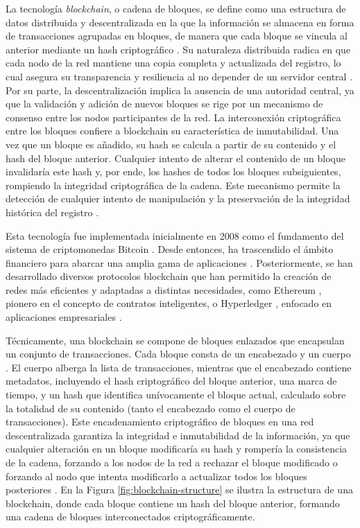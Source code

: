 La tecnología \textit{blockchain}, o cadena de bloques, se define como una estructura de datos distribuida y descentralizada en la que la información se almacena en forma de transacciones agrupadas en bloques, de manera que cada bloque se vincula al anterior mediante un hash criptográfico \cite{tripathi2023comprehensive}. Su naturaleza distribuida radica en que cada nodo de la red mantiene una copia completa y actualizada del registro, lo cual asegura su transparencia y resiliencia al no depender de un servidor central \cite{bulkowska2023implementation}. Por su parte, la descentralización implica la ausencia de una autoridad central, ya que la validación y adición de nuevos bloques se rige por un mecanismo de consenso entre los nodos participantes de la red. La interconexión criptográfica entre los bloques confiere a blockchain su característica de inmutabilidad. Una vez que un bloque es añadido, su hash se calcula a partir de su contenido y el hash del bloque anterior. Cualquier intento de alterar el contenido de un bloque invalidaría este hash y, por ende, los hashes de todos los bloques subsiguientes, rompiendo la integridad criptográfica de la cadena. Este mecanismo permite la detección de cualquier intento de manipulación y la preservación de la integridad histórica del registro \cite{bulkowska2023implementation}.

Esta tecnología fue implementada inicialmente en 2008 como el fundamento del sistema de criptomonedas Bitcoin \cite{satoshi2008bitcoin}. Desde entonces, ha trascendido el ámbito financiero para abarcar una amplia gama de aplicaciones \cite{bartolomeo2020introduccion}. Posteriormente, se han desarrollado diversos protocolos blockchain que han permitido la creación de redes más eficientes y adaptadas a distintas necesidades, como Ethereum \cite{buterin2013ethereum}, pionero en el concepto de contratos inteligentes, o Hyperledger \cite{androulaki2018hyperledger}, enfocado en aplicaciones empresariales \cite{sunny2022systematic, rennock2018blockchain}.

Técnicamente, una blockchain se compone de bloques enlazados que encapsulan un conjunto de transacciones. Cada bloque consta de un encabezado y un cuerpo \cite{tripathi2023comprehensive}. El cuerpo alberga la lista de transacciones, mientras que el encabezado contiene metadatos, incluyendo el hash criptográfico del bloque anterior, una marca de tiempo, y un hash que identifica unívocamente el bloque actual, calculado sobre la totalidad de su contenido (tanto el encabezado como el cuerpo de transacciones). Este encadenamiento criptográfico de bloques en una red descentralizada garantiza la integridad e inmutabilidad de la información, ya que cualquier alteración en un bloque modificaría su hash y rompería la consistencia de la cadena, forzando a los nodos de la red a rechazar el bloque modificado o forzando al nodo que intenta modificarlo a actualizar todos los bloques posteriores \cite{sunny2022systematic}. En la Figura \ref{fig:blockchain-structure} se ilustra la estructura de una blockchain, donde cada bloque contiene un hash del bloque anterior, formando una cadena de bloques interconectados criptográficamente.

